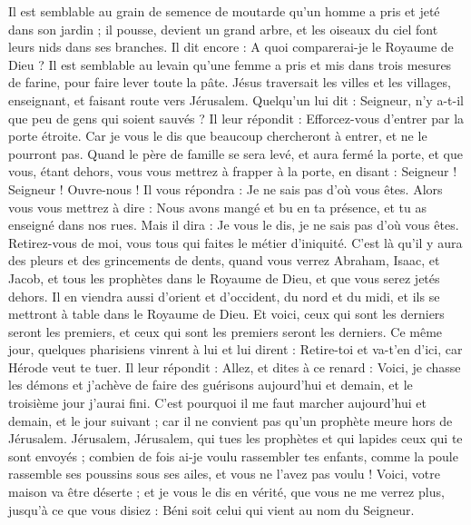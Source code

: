 \begin{multicols}{2}
{Il est semblable au grain de semence de moutarde qu'un homme a pris et jeté dans son jardin ; il pousse, devient un grand arbre, et les oiseaux du ciel font leurs nids dans ses branches.
Il dit encore : A quoi comparerai-je le Royaume de Dieu ?
Il est semblable au levain qu'une femme a pris et mis dans trois mesures de farine, pour faire lever toute la pâte.
Jésus traversait les villes et les villages, enseignant, et faisant route vers Jérusalem.
Quelqu’un lui dit : Seigneur, n'y a-t-il que peu de gens qui soient sauvés ? Il leur répondit :
Efforcez-vous d’entrer par la porte étroite. Car je vous le dis que beaucoup chercheront à entrer, et ne le pourront pas.
Quand le père de famille se sera levé, et aura fermé la porte, et que vous, étant dehors, vous vous mettrez à frapper à la porte, en disant : Seigneur ! Seigneur ! Ouvre-nous ! Il vous répondra : Je ne sais pas d'où vous êtes.
Alors vous vous mettrez à dire : Nous avons mangé et bu en ta présence, et tu as enseigné dans nos rues.
Mais il dira : Je vous le dis, je ne sais pas d'où vous êtes. Retirez-vous de moi, vous tous qui faites le métier d'iniquité.
C’est là qu’il y aura des pleurs et des grincements de dents, quand vous verrez Abraham, Isaac, et Jacob, et tous les prophètes dans le Royaume de Dieu, et que vous serez jetés dehors.
Il en viendra aussi d'orient et d'occident, du nord et du midi, et ils se mettront à table dans le Royaume de Dieu.
Et voici, ceux qui sont les derniers seront les premiers, et ceux qui sont les premiers seront les derniers.
Ce même jour, quelques pharisiens vinrent à lui et lui dirent : Retire-toi et va-t’en d'ici, car Hérode veut te tuer.
Il leur répondit : Allez, et dites à ce renard : Voici, je chasse les démons et j'achève de faire des guérisons aujourd'hui et demain, et le troisième jour j’aurai fini.
C'est pourquoi il me faut marcher aujourd'hui et demain, et le jour suivant ; car il ne convient pas qu'un prophète meure hors de Jérusalem.
\TextTitle{[grandeur]}
Jérusalem, Jérusalem, qui tues les prophètes et qui lapides ceux qui te sont envoyés ; combien de fois ai-je voulu rassembler tes enfants, comme la poule rassemble ses poussins sous ses ailes, et vous ne l'avez pas voulu !
Voici, votre maison va être déserte ; et je vous le dis en vérité, que vous ne me verrez plus, jusqu'à ce que vous disiez : Béni soit celui qui vient au nom du Seigneur.
}
\end{multicols}
